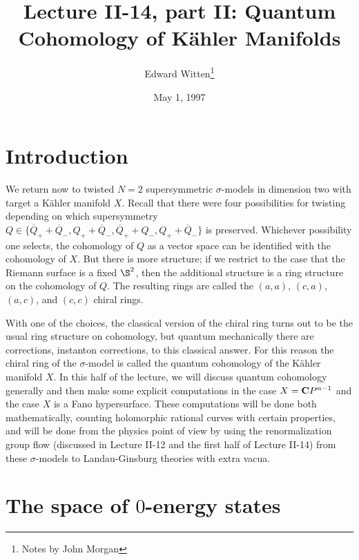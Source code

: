 \newcommand{\operatorname}[1]{\mathop{\rm #1}\nolimits}
\newcommand{\Tr}{\operatorname{Tr}}



\title{Lecture II-14, part II: Quantum Cohomology of K\"ahler Manifolds}
\author{Edward Witten\thanks{Notes by John Morgan}}
\date{May 1, 1997}



\maketitle

\section{Introduction}

We return now to twisted $N=2$ supersymmetric $\sigma$-models in
dimension two with  target a K\"ahler manifold $X$.
Recall that there were four possibilities for twisting depending on
which  supersymmetry $Q\in\{\overline Q_++\overline Q_-,Q_++\overline
Q_-,\overline Q_++Q_-, Q_++\overline Q_-\}$ is preserved.
Whichever possibility
one selects, the cohomology of $Q$ as a vector space can be identified
with the cohomology of $X$.  But there is more structure; if
we restrict to the case that the Riemann surface is a fixed $\S^2$,
then the additional structure is a ring structure on the cohomology
of $Q$. The resulting rings are called the $(a,a)$, $(c,a)$, $(a,c)$,
and $(c,c)$ chiral rings.

With one of the choices,
the classical version of the chiral ring turns out to be the
usual ring structure on cohomology, but quantum mechanically there are
corrections, instanton corrections, to this classical answer. For this
reason the chiral ring of the $\sigma$-model
is called the quantum cohomology of
the K\"ahler manifold $X$.
In this half of the lecture, we will discuss quantum cohomology
generally and then make some explicit computations in the case $X={\bf
C}P^{n-1}$ and the case $X$ is a Fano hypersurface.
These computations will be done both mathematically, counting
holomorphic rational curves with certain properties, and will be done
from the physics point of view by using the renormalization group flow
(discussed in Lecture
II-12 and the first half of Lecture II-14)
from these $\sigma$-models to Landau-Ginsburg theories
with extra vacua.



\section{The space of $0$-energy states}

